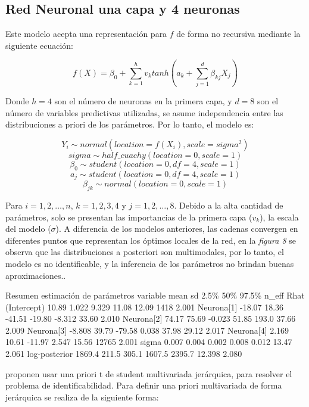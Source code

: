 \documentclass[nojss]{jss}
\begin{document}
\subsection{Red Neuronal una capa y 4 neuronas}

Este modelo acepta una representación para $f$ de forma no recursiva mediante la siguiente ecuación:

$$f(X) = \beta_0 + \sum_{k=1}^h v_k tanh\left(a_k + \sum_{j=1}^d \beta_{kj}X_j \right)$$

Donde $h=4$ son el número de neuronas en la primera capa, y $d = 8$ son el número de variables predictivas utilizadas, se asume independencia entre las distribuciones a priori de los parámetros. Por lo tanto, el modelo es:

$$Y_i \sim normal(location = f(X_i),scale = sigma^2)$$
$$sigma \sim half\_cuachy(location = 0,scale = 1)$$
$$\beta_0 \sim student(location = 0,df= 4,scale = 1)$$
$$a_j \sim student(location = 0,df=4,scale = 1)$$
$$\beta_{jk} \sim normal(location = 0,scale = 1)$$

Para $i = 1,2,\ldots,n$, $k = 1,2,3,4$ y $j = 1,2,\ldots,8$. Debido a la alta cantidad de parámetros, solo se presentan las importancias de la primera capa ($v_k$), la escala del modelo ($\sigma$). A diferencia de los modelos anteriores, las cadenas convergen en diferentes puntos que representan los óptimos locales de la red, en la \textit{figura 8} se observa que las distribuciones a posteriori son multimodales, por lo tanto, el modelo es no identificable, y la inferencia de los parámetros no brindan buenas aproximaciones.. 

\begin{CodeChunk}	
\begin{CodeOutput}
 		Resumen estimación de parámetros
  variable       mean   sd    2.5\%   50\%  97.5\% n_eff    Rhat
 (Intercept)    10.89  1.022  9.329  11.08  12.09  1418    2.001  
 Neurona[1]    -18.07  18.36 -41.51 -19.80 -8.312  33.60   2.010
 Neurona[2]     74.17  75.69 -0.023  51.85  193.0  37.66   2.009
 Neurona[3]    -8.808  39.79 -79.58  0.038  37.98  29.12   2.017  
 Neurona[4]     2.169  10.61 -11.97  2.547  15.56  12765   2.001 
 sigma          0.007  0.004  0.002  0.008  0.012  13.47   2.061 
 log-posterior 1869.4  211.5  305.1 1607.5 2395.7  12.398  2.080  
\end{CodeOutput}  
\end{CodeChunk}


\cite{Paige2001} proponen usar una priori t de student multivariada jerárquica, para resolver el problema de identificabilidad. Para definir una priori multivariada de forma jerárquica se realiza de la siguiente forma:
\end{document}
